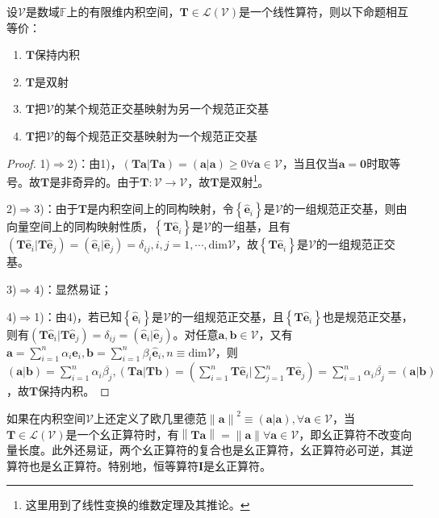 \documentclass[main.tex]{subfiles}
\begin{document}
\begin{theorem}\label{thm:II.6.3}
设$\mathcal{V}$是数域$\mathbb{F}$上的有限维内积空间，$\mathbf{T}\in\mathcal{L}\left(\mathcal{V}\right)$是一个线性算符，则以下命题相互等价：
\begin{enumerate}
    \item $\mathbf{T}$保持内积
    \item $\mathbf{T}$是双射
    \item $\mathbf{T}$把$\mathcal{V}$的某个规范正交基映射为另一个规范正交基
    \item $\mathbf{T}$把$\mathcal{V}$的每个规范正交基映射为一个规范正交基
\end{enumerate}
\end{theorem}
\begin{proof}
1)$\Rightarrow$2)：由1)，$\left(\mathbf{Ta}|\mathbf{Ta}\right)=\left(\mathbf{a}|\mathbf{a}\right)\geq0\forall\mathbf{a}\in\mathcal{V}$，当且仅当$\mathbf{a}=\mathbf{0}$时取等号。故$\mathbf{T}$是非奇异的。由于$\mathbf{T}:\mathcal{V}\rightarrow\mathcal{V}$，故$\mathbf{T}$是双射\footnote{这里用到了线性变换的维数定理及其推论。}。

2)$\Rightarrow$3)：由于$\mathbf{T}$是内积空间上的同构映射，令$\left\{\mathbf{\hat{e}}_i\right\}$是$\mathcal{V}$的一组规范正交基，则由向量空间上的同构映射性质，$\left\{\mathbf{T\hat{e}}_i\right\}$是$\mathcal{V}$的一组基，且有$\left(\mathbf{T\hat{e}}_i|\mathbf{T\hat{e}}_j\right)=\left(\mathbf{\hat{e}}_i|\mathbf{\hat{e}}_j\right)=\delta_{ij},i,j=1,\cdots,\mathrm{dim}\mathcal{V}$，故$\left\{\mathbf{T\hat{e}}_i\right\}$是$\mathcal{V}$的一组规范正交基。

3)$\Rightarrow$4)：显然易证；

4)$\Rightarrow$1)：由4)，若已知$\left\{\mathbf{\hat{e}}_i\right\}$是$\mathcal{V}$的一组规范正交基，且$\left\{\mathbf{T\hat{e}}_i\right\}$也是规范正交基，则有$\left(\mathbf{T\hat{e}}_i|\mathbf{T\hat{e}}_j\right)=\delta_{ij}=\left(\mathbf{\hat{e}}_i|\mathbf{\hat{e}}_j\right)$。对任意$\mathbf{a},\mathbf{b}\in\mathcal{V}$，又有$\mathbf{a}=\sum_{i=1}^{n}\alpha_i\mathbf{\hat{e}}_i,\mathbf{b}=\sum_{i=1}^{n}\beta_i\mathbf{\hat{e}}_i,n\equiv\mathrm{dim}\mathcal{V}$，则$\left(\mathbf{a}|\mathbf{b}\right)=\sum_{i=1}^n\alpha_i\overline{\beta_j},\left(\mathbf{Ta}|\mathbf{Tb}\right)=\left(\sum_{i=1}^n\mathbf{T\hat{e}}_i|\sum_{j=1}^n\mathbf{T\hat{e}}_j\right)=\sum_{i=1}^n\alpha_i\overline{\beta_j}=\left(\mathbf{a}|\mathbf{b}\right)$，故$\mathbf{T}$保持内积。
\end{proof}

如果在内积空间$\mathcal{V}$上还定义了欧几里德范$\left\|\mathbf{a}\right\|^2\equiv\left(\mathbf{a}|\mathbf{a}\right),\forall\mathbf{a}\in\mathcal{V}$，当$\mathbf{T}\in\mathcal{L}\left(\mathcal{V}\right)$是一个幺正算符时，有$\left\|\mathbf{Ta}\right\|=\left\|\mathbf{a}\right\|\forall\mathbf{a}\in\mathcal{V}$，即幺正算符不改变向量长度。此外还易证，两个幺正算符的复合也是幺正算符，幺正算符必可逆，其逆算符也是幺正算符。特别地，恒等算符$\mathbf{I}$是幺正算符。
\end{document}
